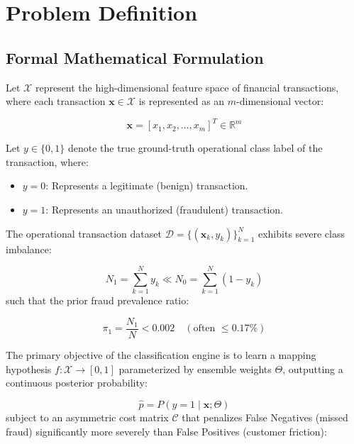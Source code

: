 \documentclass[12pt,a4paper,oneside]{report}
\begin{document}
\section{Problem Definition}

\subsection{Formal Mathematical Formulation}

Let $\mathcal{X}$ represent the high-dimensional feature space of financial transactions, where each transaction $\mathbf{x} \in \mathcal{X}$ is represented as an $m$-dimensional vector:

\begin{equation}
\mathbf{x} = [x_1, x_2, \dots, x_m]^T \in \mathbb{R}^m
\end{equation}

Let $y \in \{0, 1\}$ denote the true ground-truth operational class label of the transaction, where:

\begin{itemize}[leftmargin=0.35in]
\item $y = 0$: Represents a legitimate (benign) transaction.
\item $y = 1$: Represents an unauthorized (fraudulent) transaction.
\end{itemize}

The operational transaction dataset $\mathcal{D} = \{(\mathbf{x}_k, y_k)\}_{k=1}^N$ exhibits severe class imbalance:

\begin{equation}
N_1 = \sum_{k=1}^N y_k \ll N_0 = \sum_{k=1}^N (1 - y_k)
\end{equation}
such that the prior fraud prevalence ratio:

\begin{equation}
\pi_1 = \frac{N_1}{N} < 0.002 \quad (\text{often } \le 0.17\%)
\end{equation}

The primary objective of the classification engine is to learn a mapping hypothesis $f: \mathcal{X} \rightarrow [0, 1]$ parameterized by ensemble weights $\Theta$, outputting a continuous posterior probability:

\begin{equation}
\hat{p} = P(y = 1 \mid \mathbf{x}; \Theta)
\end{equation}
subject to an asymmetric cost matrix $\mathcal{C}$ that penalizes False Negatives (missed fraud) significantly more severely than False Positives (customer friction):
\end{document}

